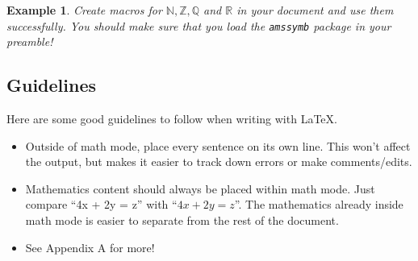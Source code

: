 \documentclass{article}
\newtheorem{example}[theorem]{Example}
\begin{document}
\begin{example}
    Create macros for $\mathbb{N}, \mathbb{Z}, \mathbb{Q}$ and $\mathbb{R}$ in your document and use them successfully.
    You should make sure that you load the \texttt{amssymb} package in your preamble!
\end{example}

\subsection{Guidelines}

Here are some good guidelines to follow when writing with \LaTeX.
\begin{itemize}
    \item Outside of math mode, place every sentence on its own line.
    This won't affect the output, but makes it easier to track down errors or make comments/edits.
    
    \item Mathematics content should always be placed within math mode.
    Just compare ``4x + 2y = z'' with ``$4x + 2y = z$''.
    The mathematics already inside math mode is easier to separate from the rest of the document.
    
    \item See Appendix A for more!
\end{itemize}
\end{document}
